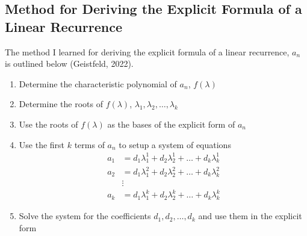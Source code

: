 \documentclass[11pt]{article}
\begin{document}
\subsection{Method for Deriving the Explicit Formula of a Linear Recurrence}
The method I learned for deriving the explicit formula of a linear recurrence, $a_n$ is outlined below (Geistfeld, 2022).
\begin{enumerate}
    \item Determine the characteristic polynomial of $a_n$, $f(\lambda)$
    \item Determine the roots of $f(\lambda)$, $\lambda_1,\lambda_2,\dots,\lambda_k$
    \item Use the roots of $f(\lambda)$ as the bases of the explicit form of $a_n$
    \item Use the first $k$ terms of $a_n$ to setup a system of equations
    \begin{align*}
        a_1 &= d_1\lambda_1^1+d_2\lambda_2^1+\dots+d_k\lambda_k^1 \\
        a_2 &= d_1\lambda_1^2+d_2\lambda_2^2+\dots+d_k\lambda_k^2 \\
        &\vdots \\ 
        a_k &= d_1\lambda_1^k+d_2\lambda_2^k+\dots+d_k\lambda_k^k
    \end{align*}

    \item Solve the system for the coefficients $d_1,d_2,\dots,d_k$ and use them in the explicit form
\end{enumerate}
\end{document}
